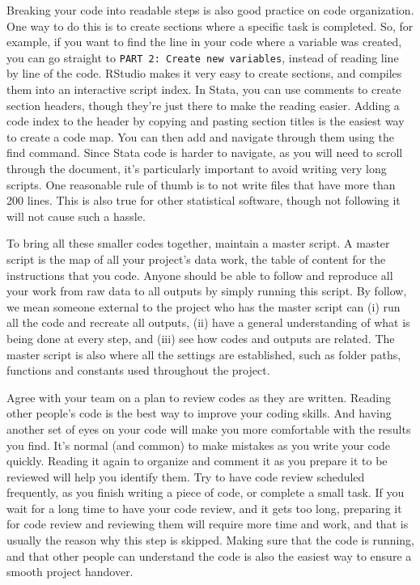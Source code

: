 Breaking your code into readable steps is also good practice on code organization. 
One way to do this is to create sections where a specific task is completed. 
So, for example, if you want to find the line in your code where a variable was created, 
you can go straight to \texttt{PART 2: Create new variables}, 
instead of reading line by line of the code.
RStudio makes it very easy to create sections, and compiles them into an interactive script index. 
In Stata, you can use comments to create section headers, 
though they're just there to make the reading easier. 
Adding a code index to the header by copying and pasting section titles is the easiest way to create a code map.
You can then add and navigate through them using the find command. 
Since Stata code is harder to navigate, as you will need to scroll through the document,
it's particularly important to avoid writing very long scripts. 
One reasonable rule of thumb is to not write files that have more than 200 lines. 
This is also true for other statistical software, 
though not following it will not cause such a hassle.

To bring all these smaller codes together, maintain a master script.
A master script is the map of all your project's data work, 
the table of content for the instructions that you code.
Anyone should be able to follow and reproduce all your work from
raw data to all outputs by simply running this script.
By follow, we mean someone external to the project who has the master script can 
(i) run all the code and recreate all outputs, 
(ii) have a general understanding of what is being done at every step, and
(iii) see how codes and outputs are related. 
The master script is also where all the settings are established, 
such as folder paths, functions and constants used throughout the project.

Agree with your team on a plan to review codes 
as they are written. 
Reading other people's code is the best way to improve your coding skills. 
And having another set of eyes on your code will make you more comfortable with the results you find. 
It's normal (and common) to make mistakes as you write your code quickly. 
Reading it again to organize and comment it as you prepare it to be reviewed will help you identify them.
Try to have code review scheduled frequently, as you finish writing a piece of code, or complete a small task.
If you wait for a long time to have your code review, and it gets too long, 
preparing it for code review and reviewing them will require more time and work, 
and that is usually the reason why this step is skipped. 
Making sure that the code is running, 
and that other people can understand the code is also the easiest way to ensure a smooth project handover.


